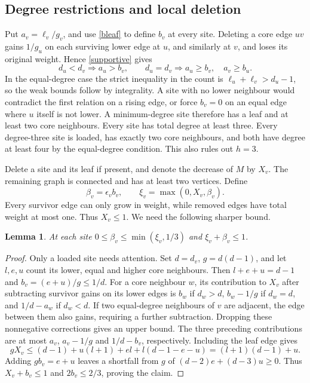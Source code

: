 \documentclass[11pt,a4paper]{article}
\newtheorem{lemma}[theorem]{Lemma}
\theoremstyle{remark}\newtheorem*{remark}{Remark}
\begin{document}
\subsection{Degree restrictions and local deletion}
Put $a_v=\ell_v/g_v$, and use \eqref{bleaf} to define $b_v$ at every site. Deleting a core edge $uv$ gains $1/g_u$ on each surviving lower edge at $u$, and similarly at $v$, and loses its original weight. Hence \eqref{supportive} gives
\[
 d_u<d_v\Longrightarrow a_u>b_v,\qquad
 d_u=d_v\Longrightarrow a_u\ge b_v,\quad a_v\ge b_u .
\]
In the equal-degree case the strict inequality in the count is $\ell_u+\ell_v>d_u-1$, so the weak bounds follow by integrality. A site with no lower neighbour would contradict the first relation on a rising edge, or force $b_v=0$ on an equal edge where $u$ itself is not lower. A minimum-degree site therefore has a leaf and at least two core neighbours. Every site has total degree at least three. Every degree-three site is loaded, has exactly two core neighbours, and both have degree at least four by the equal-degree condition. This also rules out $h=3$.

Delete a site and its leaf if present, and denote the decrease of $M$ by $X_v$. The remaining graph is connected and has at least two vertices. Define
\[
 \beta_v=\epsilon_v b_v,\qquad \xi_v=\max(0,X_v,\beta_v).
\]
Every survivor edge can only grow in weight, while removed edges have total weight at most one. Thus $X_v\le1$. We need the following sharper bound.
\begin{lemma}\label{local}
At each site $0\le\beta_v\le\min(\xi_v,1/3)$ and $\xi_v+\beta_v\le1$.
\end{lemma}
\begin{proof}
Only a loaded site needs attention. Set $d=d_v$, $g=d(d-1)$, and let $l,e,u$ count its lower, equal and higher core neighbours. Then $l+e+u=d-1$ and $b_v=(e+u)/g\le1/d$. For a core neighbour $w$, its contribution to $X_v$ after subtracting survivor gains on its lower edges is $b_w$ if $d_w>d$, $b_w-1/g$ if $d_w=d$, and $1/d-a_w$ if $d_w<d$. If two equal-degree neighbours of $v$ are adjacent, the edge between them also gains, requiring a further subtraction. Dropping these nonnegative corrections gives an upper bound. The three preceding contributions are at most $a_v$, $a_v-1/g$ and $1/d-b_v$, respectively. Including the leaf edge gives
\[
 g X_v\le(d-1)+u(l+1)+el+l(d-1-e-u)=(l+1)(d-1)+u.
\]
Adding $gb_v=e+u$ leaves a shortfall from $g$ of $(d-2)e+(d-3)u\ge0$. Thus $X_v+b_v\le1$ and $2b_v\le2/3$, proving the claim.
\end{proof}
\end{document}
